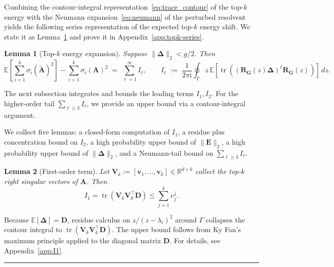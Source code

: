 \documentclass{article}
\newcommand{\twonorm}[1]{\|#1\|_2}
\newcommand{\Ex}[1]{\mbox{}\mathbb{E}\left[#1\right]}
\newcommand{\ts}{\top}
\newcommand{\R}{\mathbb{R}} %
\newcommand{\vb}{\mathbf{v}}
\newcommand{\Ab}{\mathbf{A}}
\newcommand{\Db}{\mathbf{D}}
\newcommand{\Eb}{\mathbf{E}}
\newcommand{\Gb}{\mathbf{G}}
\newcommand{\Rb}{\mathbf{R}}
\newcommand{\Vb}{\mathbf{V}}
\newcommand{\Abtil}{\tilde{\Ab}}
\newcommand{\BlackBox}{\rule{1.5ex}{1.5ex}}  %
\newenvironment{proof}{\par\noindent{\bf Proof\ }}{\hfill\BlackBox\par\medskip}
\newtheorem{lemma}{Lemma}[section]
\newcommand{\tr}{\mathop{\mathrm{tr}}}
\newcommand{\rbr}[1]{\left(#1\right)}
\newcommand{\Deltab}{\boldsymbol{\Delta}}
\begin{document}
Combining the contour-integral representation~\eqref{eq:trace_contour} of the top-$k$ energy with the Neumann expansion~\eqref{eq:neumann} of the perturbed resolvent yields the following series representation of the expected top-$k$ energy shift. We state it as Lemma~\ref{lem:topk-series} and prove it in Appendix~\ref{app:topk-series}.

\begin{lemma}[Top-$k$ energy expansion]\label{lem:topk-series}
Suppose $\twonorm{\Deltab} < g/2$. Then
\begin{equation}\label{eq:topk-series}
    \Ex{\sum_{i=1}^{k}\sigma_i(\Abtil)^2} - \sum_{i=1}^{k}\sigma_i(\Ab)^2 \;=\; \sum_{\ell=1}^{\infty} I_\ell, \qquad I_\ell \;:=\; \frac{1}{2\pi \mathrm{i}}\oint_\Gamma z\,\Ex{\tr\rbr{\rbr{\Rb_\Gb(z)\Deltab}^\ell \Rb_\Gb(z)}}\,dz.
\end{equation}
\end{lemma}

The next subsection integrates and bounds the leading terms $I_1, I_2$. For the higher-order tail $\sum_{\ell\ge 3} I_\ell$, we provide an upper bound via a contour-integral argument.


We collect five lemmas: a closed-form computation of $I_1$, a residue plus concentration bound on $I_2$, a high probability upper bound of $\twonorm{\Eb}$, a high probability upper bound of $\twonorm{\Deltab}$, and a Neumann-tail bound on $\sum_{\ell\ge3} I_\ell$.

\begin{lemma}[First-order term]\label{lem:I1}
Let $\Vb_k := [\vb_1, \ldots, \vb_k] \in \R^{d \times k}$ collect the top-$k$ right singular vectors of $\Ab$. Then
\begin{equation*}
    I_1 = \tr\rbr{\Vb_k \Vb_k^\ts \Db} \le \sum_{j=1}^{k} \nu_j^\downarrow.
\end{equation*}
\end{lemma}

\begin{proof}
    Because $\Ex{\Deltab} = \Db$, residue calculus on $z/(z-\lambda_i)^2$ around $\Gamma$ collapses the contour integral to $\tr(\Vb_k \Vb_k^\ts \Db)$. The upper bound follows from Ky Fan's maximum principle applied to the diagonal matrix $\Db$. For details, see Appendix~\ref{app:I1}.
\end{proof}
\end{document}
